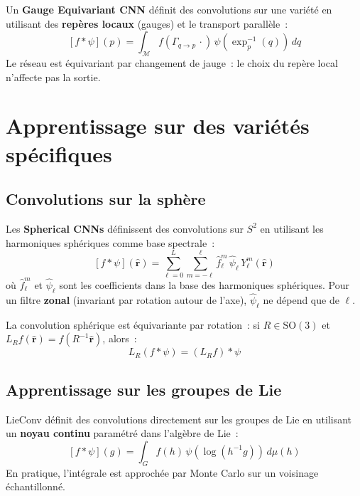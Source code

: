\begin{definition}
Un \textbf{Gauge Equivariant CNN} d\'efinit des convolutions sur une vari\'et\'e
en utilisant des \textbf{rep\`eres locaux} (gauges) et le transport parall\`ele~:
\[
    [f * \psi](p) = \int_{\mathcal{M}} f(\Gamma_{q \to p}\, \cdot)\,
    \psi(\exp_p^{-1}(q))\, dq
\]
Le r\'eseau est \'equivariant par changement de jauge~: le choix du rep\`ere local
n'affecte pas la sortie.
\end{definition}

\section{Apprentissage sur des vari\'et\'es sp\'ecifiques}

\subsection{Convolutions sur la sph\`ere}

\begin{definition}
Les \textbf{Spherical CNNs} d\'efinissent des convolutions sur $S^2$ en
utilisant les harmoniques sph\'eriques comme base spectrale~:
\[
    [f * \psi](\hat{\mathbf{r}}) = \sum_{\ell=0}^{L} \sum_{m=-\ell}^{\ell}
    \hat{f}_\ell^m\, \hat{\psi}_\ell\, Y_\ell^m(\hat{\mathbf{r}})
\]
o\`u $\hat{f}_\ell^m$ et $\hat{\psi}_\ell$ sont les coefficients dans la base
des harmoniques sph\'eriques. Pour un filtre \textbf{zonal}
(invariant par rotation autour de l'axe), $\hat{\psi}_\ell$ ne d\'epend que
de $\ell$.
\end{definition}

\begin{theoreme}
La convolution sph\'erique est \'equivariante par rotation~: si
$R \in \mathrm{SO}(3)$ et $L_R f(\hat{\mathbf{r}}) = f(R^{-1}\hat{\mathbf{r}})$, alors~:
\[
    L_R(f * \psi) = (L_R f) * \psi
\]
\end{theoreme}

\subsection{Apprentissage sur les groupes de Lie}

\begin{definition}
LieConv d\'efinit des convolutions directement sur les groupes de Lie en
utilisant un \textbf{noyau continu} param\'etr\'e dans l'alg\`ebre de Lie~:
\[
    [f * \psi](g) = \int_G f(h)\, \psi(\log(h^{-1}g))\, d\mu(h)
\]
En pratique, l'int\'egrale est approch\'ee par Monte Carlo sur un voisinage
\'echantillonn\'e.
\end{definition}

